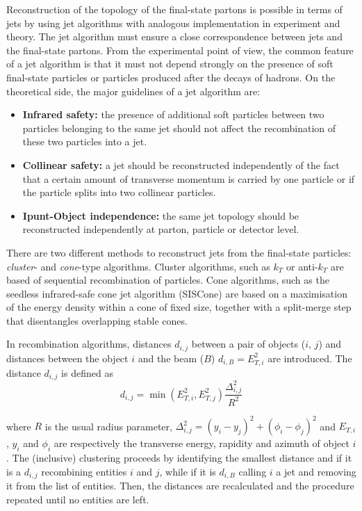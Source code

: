 \documentclass[12pt, twoside]{article}
\numberwithin{equation}{section}
\numberwithin{figure}{section}
\begin{document}
Reconstruction of the topology of the final-state partons is possible in terms of jets by using jet algorithms with analogous implementation in experiment and theory. The jet algorithm must ensure a close correspondence between jets and the final-state partons. From the experimental point of view, the common feature of a jet algorithm is that it must not depend strongly on the presence of soft final-state particles or particles produced after the decays of hadrons. On the theoretical side, the major guidelines of a jet algorithm are:
\begin{itemize}
    \item \textbf{Infrared safety:} the presence of additional soft particles between two particles belonging to the same jet should not affect the recombination of these two particles into a jet.
    \item \textbf{Collinear safety:} a jet should be reconstructed independently of the fact that a certain amount of transverse momentum is carried by one particle or if the particle splits into two collinear particles.
    \item \textbf{Ipunt-Object independence:} the same jet topology should be reconstructed independently at parton, particle or detector level.
\end{itemize}

There are two different methods to reconstruct jets from the final-state particles: \textit{cluster}- and \textit{cone}-type algorithms. Cluster algorithms, such as $k_{T}$ \cite{ktAlgorithm} or anti-$k_{T}$ are based of sequential recombination of particles. Cone algorithms, such as the seedless infrared-safe cone jet algorithm \cite{sisCone} (SISCone) are based on a maximisation of the energy density within a cone of fixed size, together with a split-merge step that disentangles overlapping stable cones.

In recombination algorithms, distances $d_{i,j}$ between a pair of objects ($i$, $j$) and distances between the object $i$ and the beam ($B$) $d_{i,B} = E^{2}_{T,i}$ are introduced. The distance $d_{i,j}$ is defined as
\begin{equation}    \label{eq:RecombinationAlgorithmsDistance}
    d_{i,j} = \min\left(E^{2}_{T,i},E^{2}_{T,j} \right) \frac{\Delta^{2}_{i,j}}{R^{2}}
\end{equation}

where $R$ is the usual radius parameter, $\Delta^{2}_{i,j} = \left(y_{i} - y_{j} \right)^{2} + \left(\phi_{i} - \phi_{j} \right)^{2}$ and $E_{T,i}$, $y_{i}$ and $\phi_{i}$ are respectively the transverse energy, rapidity and azimuth of object $i$. The (inclusive) clustering proceeds by identifying the smallest distance and if it is a $d_{i,j}$ recombining entities $i$ and $j$, while if it is $d_{i,B}$ calling $i$ a jet and removing it from the list of entities. Then, the distances are recalculated and the procedure repeated until no entities are left.
\end{document}
